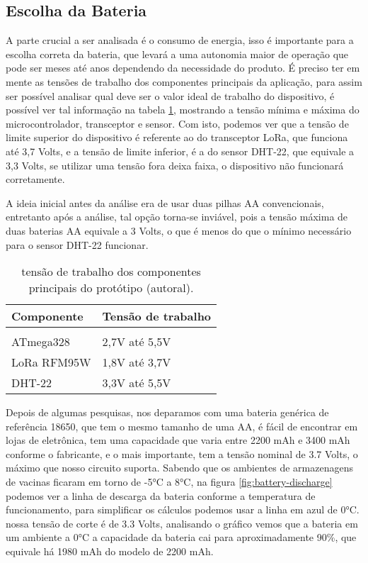 \subsection{Escolha da Bateria}
\label{metod:end-node:bateria}
A parte crucial a ser analisada é o consumo de energia, isso é importante para a escolha correta da bateria, que levará a uma autonomia maior de operação que pode ser meses até anos dependendo da necessidade do produto. É preciso ter em mente as tensões de trabalho dos componentes principais da aplicação, para assim ser possível analisar qual deve ser o valor ideal de trabalho do dispositivo, é possível ver tal informação na tabela \ref{tab:end-node-componentes-volts}, mostrando a tensão mínima e máxima do microcontrolador, transceptor e sensor. Com isto, podemos ver que a tensão de limite superior do dispositivo é referente ao do transceptor LoRa, que funciona até 3,7 Volts, e a tensão de limite inferior, é a do sensor DHT-22, que equivale a 3,3 Volts, se utilizar uma tensão fora deixa faixa, o dispositivo não funcionará corretamente. 

A ideia inicial antes da análise era de usar duas pilhas AA convencionais, entretanto após a análise, tal opção torna-se inviável, pois a tensão máxima de duas baterias AA equivale a 3 Volts, o que é menos do que o mínimo necessário para o sensor DHT-22 funcionar.

\begin{table}[H]
\centering 
\scalebox{1} {
	\begin{tabular}{l | l}
	\textbf{Componente}&\textbf{Tensão de trabalho}\\[5pt] \hline
  \\
	ATmega328&2,7V até 5,5V\\[5pt]
	LoRa RFM95W&1,8V até 3,7V\\[5pt]
	DHT-22&3,3V até 5,5V\\[5pt]
	\end{tabular}
}
\caption{tensão de trabalho dos componentes principais do protótipo (autoral).}
\label{tab:end-node-componentes-volts}
\end{table}

Depois de algumas pesquisas, nos deparamos com uma bateria genérica de referência 18650, que tem o mesmo tamanho de uma AA, é fácil de encontrar em lojas de eletrônica, tem uma capacidade que varia entre 2200 mAh e 3400 mAh conforme o fabricante, e o mais importante, tem a tensão nominal de 3.7 Volts, o máximo que nosso circuito suporta. Sabendo que os ambientes de armazenagens de vacinas ficaram em torno de -5°C a 8°C, na figura \ref{fig:battery-discharge} podemos ver a linha de descarga da bateria conforme a temperatura de funcionamento, para simplificar os cálculos podemos usar a linha em azul de 0°C. nossa tensão de corte é de 3.3 Volts, analisando o gráfico vemos que a bateria em um ambiente a 0°C a capacidade da bateria cai para aproximadamente 90\%, que equivale há 1980 mAh do modelo de 2200 mAh.

